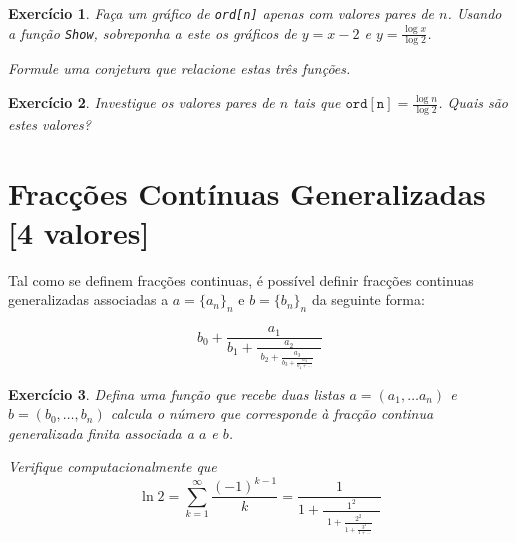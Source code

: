 \documentclass{article}
\newtheorem{ex}{Exercício}[section]
\begin{document}
\begin{ex}
Faça um gráfico de \texttt{ord[n]} apenas com valores pares de $n$. Usando a função \texttt{Show}, sobreponha a este os gráficos de $y = x-2$ e $y = \frac{\log x}{\log2}$.

Formule uma conjetura que relacione estas três funções.
\end{ex}

\begin{ex}
Investigue os valores pares de $n$ tais que $\mathtt{ord[n]} = \frac{\log n}{\log 2}$. Quais são estes valores?
\end{ex}

\section{Fracções Contínuas Generalizadas [4 valores]}

Tal como se definem fracções continuas, é possível definir fracções continuas generalizadas associadas a $a=\{a_n\}_n$ e $b=\{b_n\}_n$ da seguinte forma:

$$b_0+\displaystyle{ \frac{a_1 }
{ b_1+\displaystyle{\frac{a_2}{ 
                           {\begin{array}{l}
                              b_2+\displaystyle{ \frac{a_3}{b_3+ \displaystyle \frac{a_4}{b_4+\ldots } }  }\,\, 
                           \end{array}
                           }
                           }}}} $$

\vspace{1mm}

\begin{ex}
Defina uma função que recebe duas listas $a=(a_1,\dots a_n)$ e $b=(b_0, \dots, b_n)$ calcula o número que corresponde à fracção continua generalizada finita associada a $a$ e $b$. 

Verifique computacionalmente que $$\ln 2 = \sum_{k=1}^{\infty} \frac{(-1)^{k-1}}{k}=\displaystyle{ \frac{1 }
{ 1+\displaystyle{\frac{1^2}{ 
                           {\begin{array}{l}
                              1+\displaystyle{ \frac{2^2}{1+ \displaystyle \frac{3^2}{1+\ldots } }  }\,\, 
                           \end{array}
                           }
                           }}}} $$
\end{ex}
\end{document}
